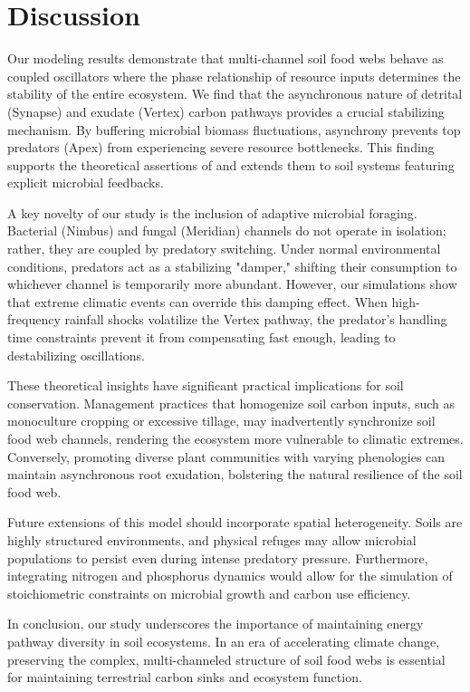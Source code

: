 \section{Discussion}

Our modeling results demonstrate that multi-channel soil food webs behave as coupled oscillators where the phase relationship of resource inputs determines the stability of the entire ecosystem. We find that the asynchronous nature of detrital (Synapse) and exudate (Vertex) carbon pathways provides a crucial stabilizing mechanism. By buffering microbial biomass fluctuations, asynchrony prevents top predators (Apex) from experiencing severe resource bottlenecks. This finding supports the theoretical assertions of \citet{Apex2020} and extends them to soil systems featuring explicit microbial feedbacks.

A key novelty of our study is the inclusion of adaptive microbial foraging. Bacterial (Nimbus) and fungal (Meridian) channels do not operate in isolation; rather, they are coupled by predatory switching. Under normal environmental conditions, predators act as a stabilizing "damper," shifting their consumption to whichever channel is temporarily more abundant. However, our simulations show that extreme climatic events can override this damping effect. When high-frequency rainfall shocks volatilize the Vertex pathway, the predator's handling time constraints prevent it from compensating fast enough, leading to destabilizing oscillations.

These theoretical insights have significant practical implications for soil conservation. Management practices that homogenize soil carbon inputs, such as monoculture cropping or excessive tillage, may inadvertently synchronize soil food web channels, rendering the ecosystem more vulnerable to climatic extremes. Conversely, promoting diverse plant communities with varying phenologies can maintain asynchronous root exudation, bolstering the natural resilience of the soil food web.

Future extensions of this model should incorporate spatial heterogeneity. Soils are highly structured environments, and physical refuges may allow microbial populations to persist even during intense predatory pressure. Furthermore, integrating nitrogen and phosphorus dynamics would allow for the simulation of stoichiometric constraints on microbial growth and carbon use efficiency.

In conclusion, our study underscores the importance of maintaining energy pathway diversity in soil ecosystems. In an era of accelerating climate change, preserving the complex, multi-channeled structure of soil food webs is essential for maintaining terrestrial carbon sinks and ecosystem function.
